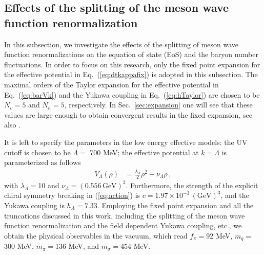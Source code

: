 \documentclass[%
reprint,
superscriptaddress,
showpacs,preprintnumbers,
 amsmath,amssymb,
 aps,
prd,
]{revtex4-1}
\def\Eq#1{Eq.~(\ref{#1})}
\def\eq#1{(\ref{#1})}
\def\sec#1{Sec.~\ref{#1}}
\begin{document}
\subsection{Effects of the splitting of the meson wave function renormalization}
\label{sec:splitting}

In this subsection, we investigate the effects of the splitting of meson wave function renormalizations on the equation of state (EoS) and the baryon number fluctuations. In order to focus on this research, only the fixed point expansion for the effective potential in \Eq{eq:dtkappafix} is adopted in this subsection. The maximal orders of the Taylor expansion for the effective potential in \Eq{eq:barVk} and the Yukawa coupling in \Eq{eq:hTaylor} are chosen to be $N_v=5$ and $N_h=5$, respectively. In \sec{sec:expansion} one will see that these values are large enough to obtain convergent results in the fixed expansion, see also \cite{Pawlowski:2014zaa}.

It is left to specify the parameters in the low energy effective models: the UV cutoff is chosen to be $\Lambda=$ 700 MeV; the effective potential at $k=\Lambda$ is parameterized as follows
\begin{align}
  V_\Lambda(\rho)&=\frac{\lambda_\Lambda}{2}\rho^2+\nu_\Lambda\rho\,,\label{}
\end{align}
with $\lambda_\Lambda=$10 and $\nu_\Lambda=(0.556\,\mathrm{GeV})^2$. Furthermore, the strength of the explicit chiral symmetry breaking in \eq{eq:action} is $c=1.97\times 10^{-3}\,(\mathrm{GeV})^3$, and the Yukawa coupling is $h_\Lambda=7.33$. Employing the fixed point expansion and all the truncations discussed in this work, including the splitting of the meson wave function renormalization and the field dependent Yukawa coupling, etc., we obtain the physical observables in the vacuum, which read $f_\pi=$92 MeV, $m_q=$300 MeV, $m_\pi=$136 MeV, and $m_\sigma=$454 MeV. 
\end{document}
